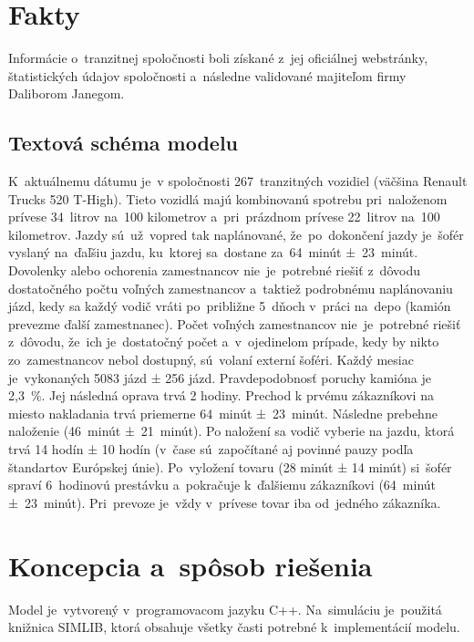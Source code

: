 \documentclass[a4paper, 11pt]{article}
\begin{document}
    \newpage
	\section{Fakty}
	Informácie o~tranzitnej spoločnosti boli získané z~jej oficiálnej
    webstránky, štatistických údajov spoločnosti a~následne validované
    majiteľom firmy Daliborom Janegom. 

    \subsection{Textová schéma modelu}
    K~aktuálnemu dátumu je~v spoločnosti
    267~tranzitných vozidiel (väčšina Renault Trucks
    520 T-High). Tieto vozidlá majú kombinovanú spotrebu pri~naloženom prívese
    34~litrov na~100 kilometrov a~pri~prázdnom prívese 22~litrov
    na~100 kilometrov.\newline
    Jazdy sú~už~vopred tak naplánované, že~po~dokončení jazdy je~šofér
    vyslaný na~ďaľšiu jazdu, ku~ktorej sa~dostane
    za~64~minút ±~23~minút.
    Dovolenky alebo ochorenia zamestnancov nie~je~potrebné riešiť
    z~dôvodu dostatočného počtu voľných zamestnancov a~taktiež
    podrobnému naplánovaniu jázd, kedy sa každý vodič vráti po~približne
    5~dňoch v~práci na~depo (kamión prevezme ďalší zamestnanec). Počet
    voľných zamestnancov nie~je~potrebné riešiť z~dôvodu, že~ich 
    je~dostatočný počet a~v~ojedinelom prípade, kedy by nikto zo~zamestnancov
    nebol dostupný, sú~volaní externí šoféri. Každý mesiac
    je~vykonaných 5083 jázd  ± 256 jázd. Pravdepodobnosť poruchy
    kamióna je 2,3~\%. Jej následná oprava trvá 2 hodiny.\newline
    Prechod k prvému zákazníkovi na miesto nakladania trvá priemerne 
    64~minút ±~23~minút. Následne prebehne naloženie (46~minút ±~21~minút).
    Po naložení sa vodič vyberie na jazdu, ktorá trvá 14 hodín ± 10 hodín
    (v~čase sú~započítané aj povinné pauzy podľa štandartov Európskej
    únie). 
    Po~vyložení tovaru (28 minút ± 14 minút) si~šofér spraví 6~hodinovú prestávku
    a~pokračuje k~ďalšiemu zákazníkovi (64~minút ±~23~minút). Pri~prevoze je~vždy v~prívese
    tovar iba od~jedného zákazníka.\newline

	\newpage
    \section{Koncepcia a~spôsob riešenia}
	Model je~vytvorený v~programovacom jazyku C++. Na~simuláciu je~použitá knižnica
    SIMLIB, ktorá obsahuje všetky časti potrebné k~implementácií modelu.
\end{document}
